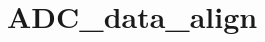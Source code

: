 \hypertarget{group___a_d_c__data__align}{\section{A\-D\-C\-\_\-data\-\_\-align}
\label{group___a_d_c__data__align}
}

